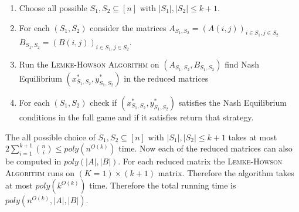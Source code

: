 \documentclass[a4paper, 11pt]{article}
\begin{document}
{\begin{enumerate}[label=(\arabic*):]
	\item Choose all possible $S_1,S_2\subseteq [n]$ with $|S_1|,|S_2|\leq k+1$.
	\item For each $(S_1,S_2)$ consider the matrices $A_{S_1,S_2}=(A(i,j))_{i\in S_1,j\in S_2}$ $B_{S_1,S_2}=(B(i,j))_{i\in S_1,j\in S_2}$. 
	\item Run the \textsc{Lemke-Howson Algorithm} on $(A_{S_1,S_2}, B_{S_1,S_2})$ find Nash Equilibrium $(x^*_{S_1,S_2},y^*_{S_1,S_2})$ in the reduced matrices
	\item For each $(S_1,S_2)$ check if $(x^*_{S_1,S_2},y^*_{S_1,S_2})$ satisfies the Nash Equilibrium conditions in the full game and if it satisfies return that strategy.
\end{enumerate}

The all possible choice of  $S_1,S_2\subseteq [n]$ with $|S_1|,|S_2|\leq k+1$ takes at most $2\sum\limits_{i=1}^{k+1}\binom{n}{i}\leq poly(n^{O(k)})$ time. Now each of the reduced matrices can also be computed in $poly(|A|,|B|)$. For each reduced matrix the \textsc{Lemke-Howson Algorithm} runs on $(K=1)\times (k+1)$ matrix. Therefore the algorithm takes at most $poly(k^{O(k)})$ time. Therefore the total running time is $poly(n^{O(k)},|A|,|B|)$.


}
\end{document}
